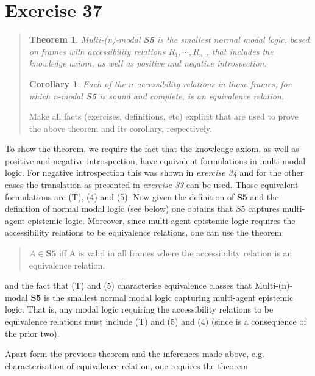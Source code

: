 \documentclass[11pt,a4paper]{article}
\newtheorem{theorem}{Theorem}[section]
\newtheorem{corollary}{Corollary}[theorem]
\begin{document}



\section*{Exercise 37}
\begin{quote}
\begin{theorem}
Multi-(n)-modal \textbf{S5} is the smallest normal modal logic, based on frames with accessibility relations $R_1 ,\cdots , R_n$ , that includes the knowledge axiom, as well as positive and negative introspection.
\end{theorem}

\begin{corollary}
Each of the $n$ accessibility relations in those frames, for which n-modal \textbf{S5} is sound and complete, is an equivalence relation.
\end{corollary}
Make all facts (exercises, definitions, etc) explicit that are used to prove the above theorem and its corollary, respectively.
\end{quote}


To show the theorem, we require the fact that the knowledge axiom, as well as positive and negative introspection, have equivalent formulations in multi-modal logic. For negative introspection this was shown in\emph{ exercise 34} and for the other cases the translation as presented in \emph{exercise 33} can be used. Those equivalent formulations are (T), (4) and (5). Now given the definition of \textbf{S5} 
and the definition of normal modal logic (see below) one obtains that $S5$ captures multi-agent epistemic logic. Moreover, since multi-agent epistemic logic requires the accessibility relations to be equivalence relations, one can use the theorem 
\begin{quote}
$A \in \textbf{S5}$ iff A is valid in all frames where the accessibility relation is an equivalence relation. 
\end{quote}
and the fact that (T) and (5) characterise equivalence classes that Multi-(n)-modal \textbf{S5} is the smallest normal modal logic capturing multi-agent epistemic logic. That is, any modal logic requiring the accessibility relations to be equivalence relations must include (T) and (5) and (4) (since is a consequence of the prior two).

Apart form the previous theorem and the inferences made above, e.g. characterisation of equivalence relation, one requires the theorem 
\end{document}
